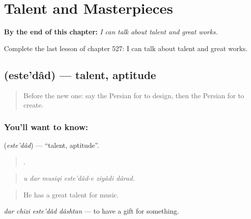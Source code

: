 
\chapter{Talent and Masterpieces}
\label{ch:fa-talent-and-masterpieces}

\begin{chapteropening}
\textbf{By the end of this chapter:} \emph{I can talk about talent and great works.}

Complete the last lesson of chapter 527: I can talk about talent and great works.
\end{chapteropening}

\section[\texorpdfstring{\fa{استعداد} (este'dâd)}{استعداد (este'dâd)}]{ (este'dâd) — talent, aptitude}

\label{lesson:FA-C527-estedad}



\begin{quote}
Before the new one: say the Persian for to design, then the Persian for to create.
\end{quote}

\subsection*{You'll want to know: }
\textbf{} (\emph{este'dâd}) — \textquotedblleft{}talent, aptitude\textquotedblright{}.

\begin{quote}
     .
\end{quote}

\begin{quote}
\emph{u dar musiqi este'dâd-e ziyâdi dârad.}
\end{quote}

\begin{quote}
He has a great talent for music.
\end{quote}

\emph{dar chizi este'dâd dâshtan} — to have a gift for something.

